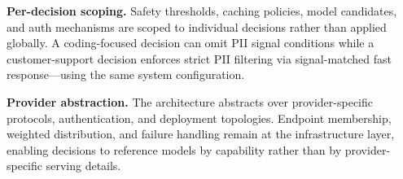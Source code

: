 \noindent\textbf{Per-decision scoping.}
Safety thresholds, caching policies, model candidates, and auth mechanisms are scoped to individual decisions rather than applied globally.
A coding-focused decision can omit PII signal conditions while a customer-support decision enforces strict PII filtering via signal-matched fast response---using the same system configuration.

\noindent\textbf{Provider abstraction.}
The architecture abstracts over provider-specific protocols, authentication, and deployment topologies.
Endpoint membership, weighted distribution, and failure handling remain at the infrastructure layer, enabling decisions to reference models by capability rather than by provider-specific serving details.
